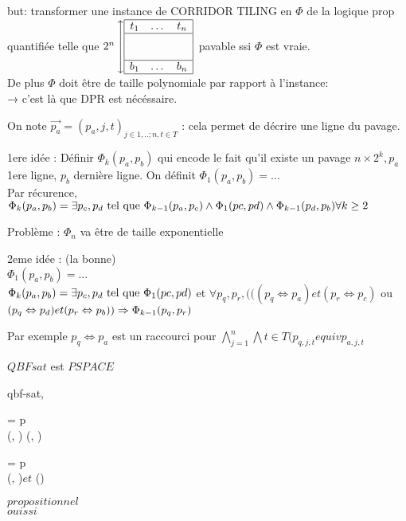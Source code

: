 \documentclass[10pt,a4paper]{article}
\begin{document}
\begin{dem}

but:  transformer une instance de CORRIDOR TILING en $\Phi$ de la logique prop quantifiée telle que
$ 2^n  \left\updownarrow
\begin{array}{|ccc|}
 \hline
t_1 & \dots & t_n \\
\hline
&&\\
&&\\
\hline
b_1 & \dots & b_n \\
\hline
\end{array} \right. $
 pavable ssi $\Phi$ est vraie.\\
De plus $\Phi$ doit être de taille polynomiale par rapport à l'instance:\\ → c'est là que DPR est nécéssaire.

On note $\vec{p_a} = (p_a, j, t)_{j \in { 1, ..; n}, t \in T}$ : cela permet de décrire une ligne du pavage.

1ere idée : Définir $\Phi_k (p_a, p_b)$ qui encode le fait qu'il existe un pavage $n \times 2^k , p_a$ 1ere ligne, $p_b$ dernière ligne.
On définit $\Phi_1 (p_a, p_b) = \dots$\\
Par récurence, $\Phi_k(p_a, p_b) = \exists p_c, p_d \text{ tel que } \Phi_{k-1} (p_a, p_c) \wedge \Phi_1(pc, pd) \wedge\Phi_{k-1}(p_d, p_b) \forall k \geq 2$

Problème : $\Phi_n$ va être de taille exponentielle

2eme idée : (la bonne)\\
$\Phi_1 (p_a, p_b) = ...$\\
$\Phi_k(p_a, p_b) = \exists p_c, p_d \text{ tel que } \Phi_1(pc, pd)$ et $\forall p_q, p_r , (((p_q \Leftrightarrow p_a) et (p_r \Leftrightarrow p_c)$ ou $(p_q \Leftrightarrow p_d) et (p_r \Leftrightarrow p_b))\\
 \Rightarrow \Phi_{k-1} (p_q, p_r)$


Par exemple $p_q \Leftrightarrow p_a$ est un raccourci pour $\bigwedge_{j=1}^n \bigwedge t \in T (p_{q,j,t} equiv p_{a, j, t}$
\end{dem}
\begin{thm}
$QBF sat$ est $PSPACE$
\end{thm}

\begin{center}\begin{minipage}{1pt}
\begin{algorithm}{qbf-sat}{\mu, \Phi}
\begin{SWITCH}
 \item{\Phi = \exists p \, \Psi} \\
  \RETURN {}(\mu [p:=0], \Psi)  (\mu[p:=1], \Psi)
  \item{\Phi = \forall p \, \Psi} \\
  \RETURN  {}(\mu [p:=0], \Psi)$ et $ (\mu[p:=1] \Psi)
\item{\Phi$ propositionnel $}\\
  \RETURN $oui ssi $\mu \models \Phi
\end{SWITCH}
\end{algorithm}
\end{minipage}\end{center}
\end{document}
